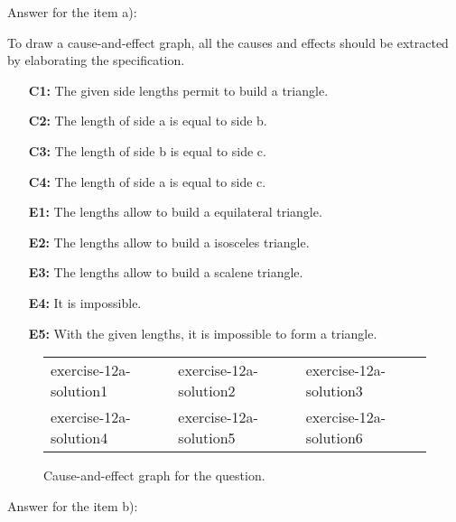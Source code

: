 \begin{solution}
    Answer for the item a):
    
    To draw a cause-and-effect graph, all the causes and effects should be extracted by elaborating the specification.
    
    \begin{enumerate}[nosep]
        \item[\textbf{C1:}] The given side lengths permit to build a triangle.
        \item[\textbf{C2:}] The length of side a is equal to side b.
        \item[\textbf{C3:}] The length of side b is equal to side c.
        \item[\textbf{C4:}] The length of side a is equal to side c.
        \item[\textbf{E1:}] The lengths allow to build a equilateral triangle.
        \item[\textbf{E2:}] The lengths allow to build a isosceles triangle.
        \item[\textbf{E3:}] The lengths allow to build a scalene triangle.
        \item[\textbf{E4:}] It is impossible.
        \item[\textbf{E5:}] With the given lengths, it is impossible to form a triangle.
    \end{enumerate}
    
    \begin{figure}[H]
        \centering
        \begin{tabular}{iii}
            exercise-12a-solution1 & exercise-12a-solution2 & exercise-12a-solution3\\
            exercise-12a-solution4 & exercise-12a-solution5 & exercise-12a-solution6
        \end{tabular}
        \caption{Cause-and-effect graph for the question.}
        \label{fig:cne-graphs}
    \end{figure}
    
    Answer for the item b):
    

\end{solution}
